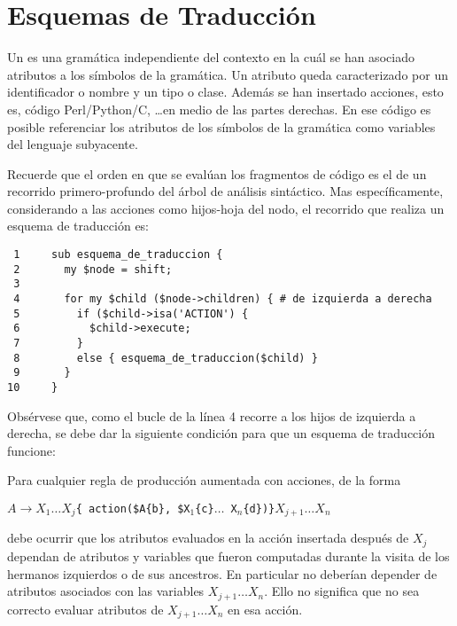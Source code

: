 \section{Esquemas de Traducción}
Un  es una gramática independiente del
contexto en la cuál se han asociado atributos a los símbolos de la gramática.
Un atributo queda caracterizado por un identificador
o nombre y un tipo o clase. Además se han insertado acciones, esto es,
código Perl/Python/C, \ldots en medio de las partes derechas.
En ese código es posible referenciar los atributos de los
símbolos de la gramática como variables del lenguaje subyacente.

Recuerde que el orden en que se evalúan los fragmentos de código
es el de un recorrido primero-profundo del árbol de análisis sintáctico.
Mas específicamente, considerando a las acciones como hijos-hoja del nodo,
el recorrido que realiza un esquema de traducción es:

\begin{verbatim}
 1     sub esquema_de_traduccion {
 2       my $node = shift;
 3 
 4       for my $child ($node->children) { # de izquierda a derecha
 5         if ($child->isa('ACTION') {
 6           $child->execute;
 7         }
 8         else { esquema_de_traduccion($child) }
 9       }
10     }
\end{verbatim}

Obsérvese que, como el bucle de la línea 4 recorre a los hijos
de izquierda a derecha, se debe dar la siguiente
condición para que un esquema  de traducción funcione:

Para cualquier regla de producción aumentada con acciones, de la forma 

\begin{center}
$A \rightarrow X_1 \ldots X_j$\verb|{ action($A{b}, $X|$_1$\verb|{c}|$ \ldots$\verb| X|$_n$\verb|{d})}|$X_{j+1} \ldots X_n$
\end{center}

debe ocurrir que los atributos evaluados en
la acción insertada después de $X_j$ 
dependan de atributos y variables que fueron computadas durante
la visita de los hermanos izquierdos o de sus ancestros.
En particular no deberían depender de atributos asociados
con las variables $X_{j+1} \ldots X_n$. Ello no significa que
no sea correcto evaluar atributos de $X_{j+1} \ldots X_n$
en esa acción.

